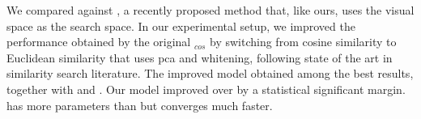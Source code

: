 We compared against \wordvisual{}, a recently proposed method that, like ours, uses the visual space as the search space.
In our experimental setup, we improved the performance obtained by the original \wordvisual{}$_{cos}$ by switching from cosine similarity to Euclidean similarity that uses \gls{pca} and whitening, following state of the art in similarity search literature.
The improved \wordvisual{} model obtained among the best results, together with \densettv{} and \widedeepttv{}.
Our \widedeepttv{} model improved over \wordvisual{} by a statistical significant margin.
\widedeepttv{} has more parameters than \wordvisual{} but converges much faster.
